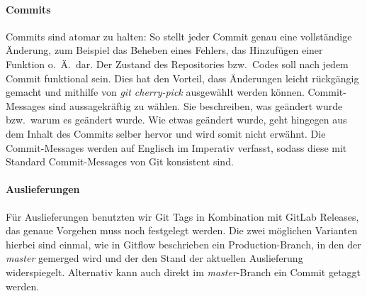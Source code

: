 \paragraph{Commits}
Commits sind atomar zu halten:
So stellt jeder Commit genau eine vollständige Änderung, zum Beispiel das Beheben eines
Fehlers, das Hinzufügen einer Funktion o.\ Ä.\ dar.
Der Zustand des Repositories bzw.\ Codes soll nach jedem Commit funktional sein.
Dies hat den Vorteil, dass Änderungen leicht rückgängig gemacht und mithilfe von
\textit{git cherry-pick} ausgewählt werden können.
Commit-Messages sind aussagekräftig zu wählen.
Sie beschreiben, was geändert wurde bzw.\ warum es geändert wurde.
Wie etwas geändert wurde, geht hingegen aus dem Inhalt des Commits selber hervor und wird somit nicht
erwähnt.
Die Commit-Messages werden auf Englisch im Imperativ verfasst, sodass
diese mit Standard Commit-Messages von Git konsistent sind.

\paragraph{Auslieferungen}\label{subsec:auslieferungen}
Für Auslieferungen benutzten wir Git Tags in Kombination mit GitLab Releases, das genaue Vorgehen
muss noch festgelegt werden.
Die zwei möglichen Varianten hierbei sind einmal, wie in Gitflow beschrieben ein
Production-Branch, in den der \textit{master} gemerged wird und der den Stand der aktuellen Auslieferung
widerspiegelt.
Alternativ kann auch direkt im \textit{master}-Branch ein Commit getaggt werden.
